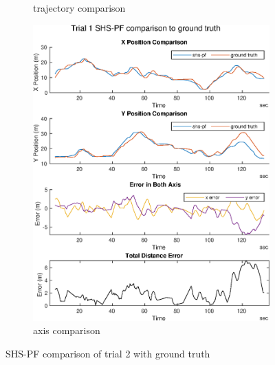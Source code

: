 \begin{figure}[H]
\begin{subfigure}[t]{.45\textwidth}
		
		\caption{trajectory comparison}
		\label{fig:shspf_trial2_on_map}
	\end{subfigure}
	\begin{subfigure}[t]{.45\textwidth}
		\centering
		\includegraphics[width=\linewidth]{images/20201029_1603_shs-pf_trial_1_1}
		\caption{axis comparison}
		\label{fig:shspf_trial2_comparison}
	\end{subfigure}
	\caption{SHS-PF comparison of trial 2 with ground truth}
	\label{fig:shspf_trial2_shs_gt_comparison}
\end{figure}

